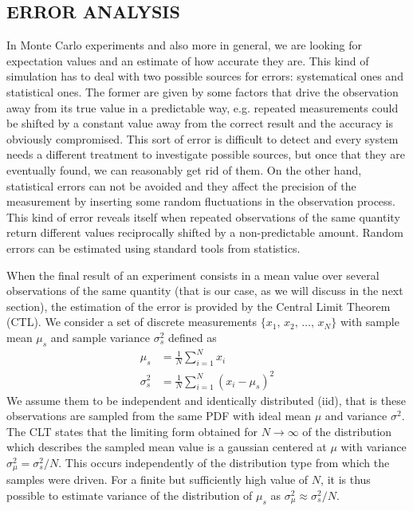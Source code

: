 \subsection{ERROR ANALYSIS} \label{sec:error analysis}
In Monte Carlo experiments and also more in general, we are looking for expectation values and an estimate of how accurate they are. This kind of simulation has to deal with two possible sources for errors: systematical ones and statistical ones. The former are given by some factors that drive the observation away from its true value in a predictable way, e.g. repeated measurements could be shifted by a constant value away from the correct result and the accuracy is obviously compromised. This sort of error is difficult to detect and every system needs a different treatment to investigate possible sources, but once that they are eventually found, we can reasonably get rid of them. On the other hand, statistical errors can not be avoided and they affect the precision of the measurement by inserting some random fluctuations in the observation process. This kind of error reveals itself when repeated observations of the same quantity return different values reciprocally shifted by a non-predictable amount. Random errors can be estimated using standard tools from statistics.

When the final result of an experiment consists in a mean value over several observations of the same quantity (that is our case, as we will discuss in the next section), the estimation of the error is provided by the Central Limit Theorem (CTL). We consider a set of discrete measurements $\{x_1,\,x_2,\,\dots, \, x_N\}$ with sample mean $\mu_s$ and sample variance $\sigma_s^2$ defined as
\begin{align*}
    \mu_s &= \frac{1}{N} \sum_{i=1}^N x_i \\
    \sigma_s^2 &= \frac{1}{N} \sum_{i=1}^N (x_i - \mu_s)^2
\end{align*}
We assume them to be independent and identically distributed (iid), that is these observations are sampled from the same PDF with ideal mean $\mu$ and variance $\sigma^2$. The CLT states that the limiting form obtained for $N\rightarrow \infty$ of the distribution which describes the sampled mean value is a gaussian centered at $\mu$ with variance $\sigma_\mu^2 = \sigma_s^2/N$. This occurs independently of the distribution type from which the samples were driven. For a finite but sufficiently high value of $N$, it is thus possible to estimate variance of the distribution of $\mu_s$ as $\sigma_\mu^2 \approx \sigma_s^2/N$.

